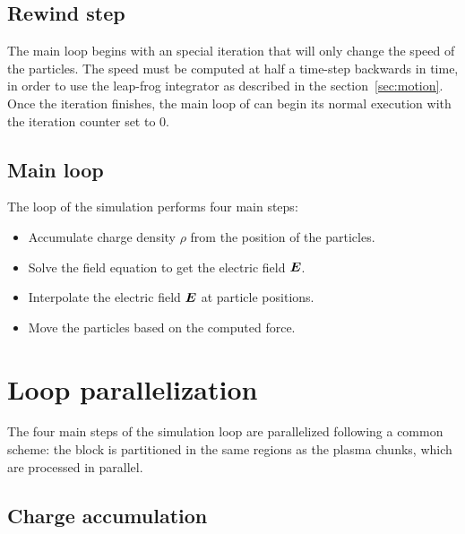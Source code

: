 \subsection{Rewind step}

The main loop begins with an special iteration that will only change the speed 
of the particles. The speed must be computed at half a time-step backwards in 
time, in order to use the leap-frog integrator as described in the 
section~\ref{sec:motion}. Once the iteration finishes, the main loop of can 
begin its normal execution with the iteration counter set to 0.

\subsection{Main loop}

The loop of the simulation performs four main steps:

\begin{itemize}
\item Accumulate charge density $\rho$ from the position of the particles.
\item Solve the field equation to get the electric field $\bm{E}$.
\item Interpolate the electric field $\bm{E}$ at particle positions.
\item Move the particles based on the computed force.
\end{itemize}

\section{Loop parallelization}

The four main steps of the simulation loop are parallelized following a common 
scheme: the block is partitioned in the same regions as the plasma chunks, which 
are processed in parallel.

\subsection{Charge accumulation}

